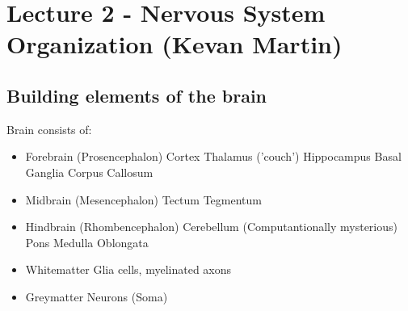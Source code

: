\documentclass[english,11pt]{article}
\begin{document}
\newpage
\section{Lecture 2 - Nervous System Organization (Kevan Martin)}


\subsection{Building elements of the brain}
Brain consists of:
\begin{itemize}
\item Forebrain (Prosencephalon)
\subitem Cortex
\subitem Thalamus ('couch')
\subitem Hippocampus
\subitem Basal Ganglia
\subitem Corpus Callosum
\item Midbrain (Mesencephalon)
\subitem Tectum
\subitem Tegmentum
\item Hindbrain (Rhombencephalon)
\subitem Cerebellum (Computantionally mysterious)
\subitem Pons
\subitem Medulla Oblongata

\item Whitematter
\subitem Glia cells, myelinated axons
\item Greymatter
\subitem Neurons (Soma)
\end{itemize}
\end{document}
